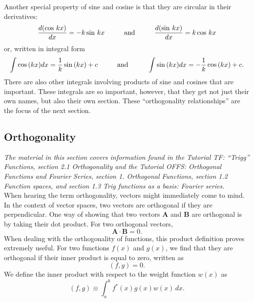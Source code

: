 \documentclass[11pt]{report}
\begin{document}
Another special property of sine and cosine is that they are circular in their derivatives:
    \begin{equation}
        \frac{d(\cos\,kx)}{dx} = -k\sin\,kx \text{\hspace{1cm}and\hspace{1cm}} \frac{d(\sin\,kx)}{dx} = k\cos\,kx
    \end{equation}
or, written in integral form
    \begin{equation}
        \int\cos{(kx)}dx = \frac{1}{k}\sin{(kx)}+c \text{\hspace{1cm}and\hspace{1cm}} \int\sin{(kx)}dx = -\frac{1}{k}\cos{(kx)}+c.
    \end{equation}
There are also other integrals involving products of sine and cosines that are important. These integrals are so important, however, that they get not just their own names, but also their own section. These ``orthogonality relationships'' are the focus of the next section.



\subsection{Orthogonality}

\emph{The material in this section covers information found in the Tutorial TF: “Trigg” Functions, section 2.1 Orthogonality and the Tutorial OFFS: Orthogonal Functions and Fourier Series, section 1. Orthogonal Functions, section 1.2 Function spaces, and section 1.3 Trig functions as a basis: Fourier series.}\\

When hearing the term orthogonality, vectors might immediately come to mind. In the context of vector spaces, two vectors are orthogonal if they are perpendicular. One way of showing that two vectors $\mathbf{A}$ and $\mathbf{B}$ are orthogonal is by taking their dot product. For two orthogonal vectors,
        \[\mathbf{A}\cdot\mathbf{B}=0.\]
When dealing with the orthogonality of functions, this product definition proves extremely useful. For two functions $f(x)$ and $g(x)$, we find that they are orthogonal if their inner product is equal to zero, written as 
    \begin{equation*}
        \left(f,g\right) = 0. 
    \end{equation*}
We define the inner product with respect to the weight function $w(x)$ as
    \begin{equation}
        \left(f,g\right) \equiv \int_a^b f^*(x)g(x)w(x)\,dx.
    \end{equation}
\end{document}
